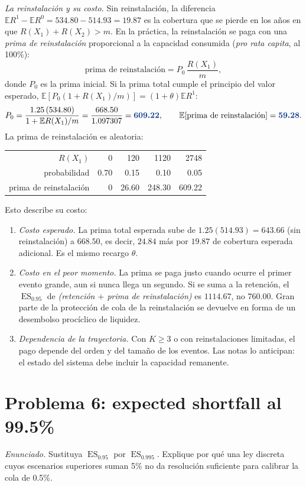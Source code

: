 \documentclass[11pt,reqno]{amsart}
\theoremstyle{definition}\newtheorem{definition}[theorem]{Definición}
\theoremstyle{remark}\newtheorem{remark}[theorem]{Observación}
\DeclareMathOperator{\ES}{ES}
\newcommand{\E}{\mathbb E}
\newcommand{\resultado}[1]{\ensuremath{{\color{resultblue}\boldsymbol{#1}}}}
\begin{document}
\emph{La reinstalación y su costo.} Sin reinstalación, la diferencia $\E R^{1}-\E R^{0}=534.80-514.93=19.87$ es la cobertura que se pierde en los años en que $R(X_1)+R(X_2)>m$. En la práctica, la reinstalación se paga con una \emph{prima de reinstalación} proporcional a la capacidad consumida (\emph{pro rata capita}, al 100\%):
\[
\text{prima de reinstalación}=P_0\,\frac{R(X_1)}{m},
\]
donde $P_0$ es la prima inicial. Si la prima total cumple el principio del valor esperado, $\E[P_0(1+R(X_1)/m)]=(1+\theta)\E R^{1}$:
\[
P_0=\frac{1.25\,(534.80)}{1+\E R(X_1)/m}=\frac{668.50}{1.097307}=\resultado{609.22},\qquad
\E[\text{prima de reinstalación}]=\resultado{59.28}.
\]
La prima de reinstalación es aleatoria:
\begin{center}
\begin{tabular}{rrrrr}
\toprule
$R(X_1)$ & 0 & 120 & 1120 & 2748\\
probabilidad & 0.70 & 0.15 & 0.10 & 0.05\\
prima de reinstalación & 0 & 26.60 & 248.30 & 609.22\\
\bottomrule
\end{tabular}
\end{center}
Esto describe su costo:
\begin{enumerate}[label=(\roman*),leftmargin=2em]
\item \emph{Costo esperado.} La prima total esperada sube de $1.25(514.93)=643.66$ (sin reinstalación) a $668.50$, es decir, $24.84$ más por $19.87$ de cobertura esperada adicional. Es el mismo recargo $\theta$.
\item \emph{Costo en el peor momento.} La prima se paga justo cuando ocurre el primer evento grande, aun si nunca llega un segundo. Si se suma a la retención, el $\ES_{0.95}$ de \emph{(retención $+$ prima de reinstalación)} es $1114.67$, no $760.00$. Gran parte de la protección de cola de la reinstalación se devuelve en forma de un desembolso procíclico de liquidez.
\item \emph{Dependencia de la trayectoria.} Con $K\ge3$ o con reinstalaciones limitadas, el pago depende del orden y del tamaño de los eventos. Las notas lo anticipan: el estado del sistema debe incluir la capacidad remanente.
\end{enumerate}

\section{Problema 6: expected shortfall al 99.5\%}
\emph{Enunciado.} Sustituya $\ES_{0.95}$ por $\ES_{0.995}$. Explique por qué una ley discreta cuyos escenarios superiores suman 5\% no da resolución suficiente para calibrar la cola de 0.5\%.
\end{document}
